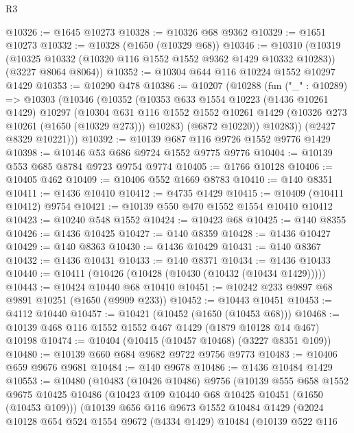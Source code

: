 \begin{lexlean}{R3}
\begin{coremodule}
@10326 := @1645 @10273
@10328 := @10326 @68 @9362
@10329 := @1651 @10273
@10332 := @10328 (@1650 (@10329 @68))
@10346 := @10310
    (@10319 (@10325 @10332 (@10320 @116 @1552 @1552 @9362 @1429 @10332 @10283)) (@3227 @8064 @8064))
@10352 := @10304 @644 @116 @10224 @1552 @10297 @1429
@10353 := @10290 @478
@10386 := @10207
    (@10288
      (fun ("_" : @10289) =>
      @10303
        (@10346
          (@10352
            (@10353
              @633
              @1554
              @10223
              (@1436 @10261 @1429)
              @10297
              (@10304
                @631
                @116
                @1552
                @1552
                @10261
                @1429
                (@10326 @273 @10261 (@1650 (@10329 @273)))
                @10283)
              (@6872 @10220))
            @10283))
        (@2427 @8329 @10221)))
@10392 := @10139 @687 @116 @9726 @1552 @9776 @1429
@10398 := @10146 @53 @686 @9724 @1552 @9775 @9776
@10404 := @10139 @553 @685 @8784 @9723 @9754 @9774
@10405 := @1766 @10128
@10406 := @10405 @462
@10409 := @10406 @552 @1669 @8783
@10410 := @140 @8351
@10411 := @1436 @10410
@10412 := @4735 @1429
@10415 := @10409 (@10411 @10412) @9754
@10421 := @10139 @550 @470 @1552 @1554 @10410 @10412
@10423 := @10240 @548 @1552
@10424 := @10423 @68
@10425 := @140 @8355
@10426 := @1436 @10425
@10427 := @140 @8359
@10428 := @1436 @10427
@10429 := @140 @8363
@10430 := @1436 @10429
@10431 := @140 @8367
@10432 := @1436 @10431
@10433 := @140 @8371
@10434 := @1436 @10433
@10440 := @10411 (@10426 (@10428 (@10430 (@10432 (@10434 @1429)))))
@10443 := @10424 @10440 @68 @10410
@10451 := @10242 @233 @9897 @68 @9891 @10251 (@1650 (@9909 @233))
@10452 := @10443 @10451
@10453 := @4112 @10440
@10457 := @10421 (@10452 (@1650 (@10453 @68)))
@10468 := @10139 @468 @116 @1552 @1552 @467 @1429 (@1879 @10128 @14 @467) @10198
@10474 := @10404 (@10415 (@10457 @10468) (@3227 @8351 @109))
@10480 := @10139 @660 @684 @9682 @9722 @9756 @9773
@10483 := @10406 @659 @9676 @9681
@10484 := @140 @9678
@10486 := @1436 @10484 @1429
@10553 := @10480
    (@10483
      (@10426 @10486)
      @9756
      (@10139
        @555
        @658
        @1552
        @9675
        @10425
        @10486
        (@10423 @109 @10440 @68 @10425 @10451 (@1650 (@10453 @109)))
        (@10139
          @656
          @116
          @9673
          @1552
          @10484
          @1429
          (@2024
            @10128
            @654
            @524
            @1554
            @9672
            (@4334 @1429)
            @10484
            (@10139
              @522
              @116

\end{coremodule}
\end{lexlean}
